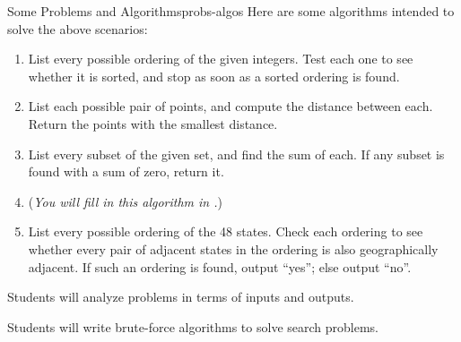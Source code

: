 \documentclass{tufte-handout}
\begin{document}
\begin{model}{Some Problems and Algorithms}{probs-algos}
\vspace{0.5in}
Here are some algorithms intended to solve the above scenarios:
  \begin{enumerate}[label=(\alph*)]
  \item List every possible ordering of the given integers.  Test each
    one to see whether it is sorted, and stop as soon as a sorted
    ordering is found.
  \item List each possible pair of points, and compute the distance
    between each.  Return the points with the smallest distance.
  \item List every subset of the given set, and find the sum of each.
    If any subset is found with a sum of zero, return it.
  \item (\emph{You will fill in this algorithm in .})
  \item List every possible ordering of the 48 states.  Check each
    ordering to see whether every pair of adjacent states in the
    ordering is also geographically adjacent.  If such an ordering is
    found, output ``yes''; else output ``no''.
  \end{enumerate}
\end{model}

\begin{objective}
  Students will analyze problems in terms of inputs and outputs.
\end{objective}

\begin{objective}
  Students will write brute-force algorithms to solve search problems.
\end{objective}
\end{document}

